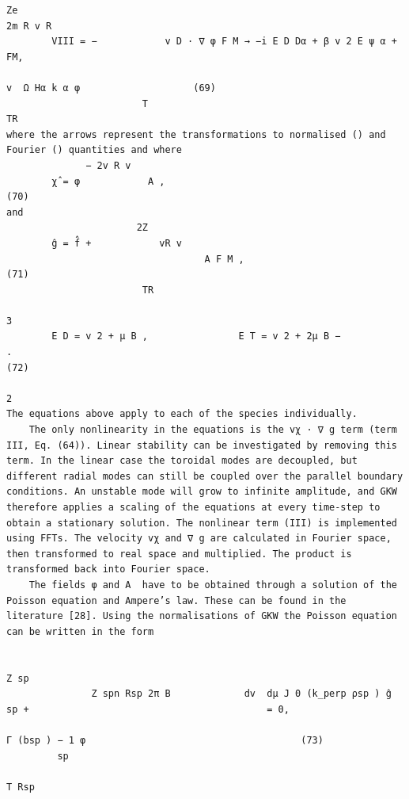 \documentclass[a4paper]{article}
\newcommand{\gkwpagefont}{\fontsize{6.0pt}{7.55pt}\selectfont}
\begin{document}
\begin{Verbatim}[fontsize=\gkwpagefont]
                       Ze                                                                                 2m R v R
        VIII = −            v D · ∇ φ F M → −i E D Dα + β v 2 E ψ α +                                                             FM,
                                                                                                                     v  Ω Hα k α φ                    (69)
                        T                                                                                   TR
where the arrows represent the transformations to normalised () and Fourier () quantities and where
              − 2v R v  
        χ̂ = φ            A ,                                                                                                                         (70)
and
                       2Z
        ĝ = f̂ +            vR v 
                                   A F M ,                                                                                                            (71)
                        TR
                                                                              3
        E D = v 2 + μ B ,                E T = v 2 + 2μ B −                     .                                                                    (72)
                                                                              2
The equations above apply to each of the species individually.
    The only nonlinearity in the equations is the vχ · ∇ g term (term III, Eq. (64)). Linear stability can be investigated by removing this
term. In the linear case the toroidal modes are decoupled, but different radial modes can still be coupled over the parallel boundary
conditions. An unstable mode will grow to infinite amplitude, and GKW therefore applies a scaling of the equations at every time-step to
obtain a stationary solution. The nonlinear term (III) is implemented using FFTs. The velocity vχ and ∇ g are calculated in Fourier space,
then transformed to real space and multiplied. The product is transformed back into Fourier space.
    The fields φ and A  have to be obtained through a solution of the Poisson equation and Ampere’s law. These can be found in the
literature [28]. Using the normalisations of GKW the Poisson equation can be written in the form
                                                                                                                
                                                                                          Z sp
               Z spn Rsp 2π B             dv  dμ J 0 (k_perp ρsp ) ĝ sp +                                          = 0,
                                                                                                   Γ (bsp ) − 1 φ                                      (73)
         sp
                                                                                          T Rsp


\end{Verbatim}
\end{document}

